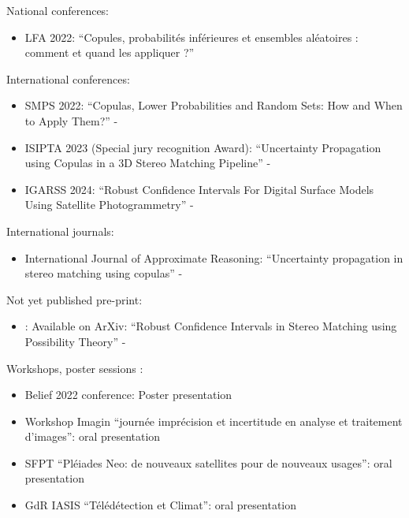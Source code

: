 \noindent National conferences:
\begin{itemize}
    \item LFA 2022: ``Copules, probabilités inférieures et ensembles aléatoires : comment et quand les appliquer ?''  \cite{malinowski_copules_2022}
\end{itemize}
International conferences:
\begin{itemize}
    \item SMPS 2022: ``Copulas, Lower Probabilities and Random Sets: How and When to Apply Them?'' - \cite{malinowski_copulas_2022}
    \item ISIPTA 2023 (Special jury recognition Award): ``Uncertainty Propagation using Copulas in a 3D Stereo Matching Pipeline'' -  \cite{malinowski_uncertainty_2023}
    \item IGARSS 2024: ``Robust Confidence Intervals For Digital Surface Models Using Satellite Photogrammetry'' -  \cite{malinowski_robust_2024}
\end{itemize}
International journals:
\begin{itemize}
    \item International Journal of Approximate Reasoning: ``Uncertainty propagation in stereo matching using copulas'' -  \cite{malinowski_uncertainty_2024}
\end{itemize}
Not yet published pre-print:
\begin{itemize}
    \item : Available on ArXiv: ``Robust Confidence Intervals in Stereo Matching using Possibility Theory'' - \cite{malinowski_robust_2024-1}
\end{itemize}
Workshops, poster sessions \etc:
\begin{itemize}
    \item Belief 2022 conference: Poster presentation
    \item Workshop Imagin ``journée imprécision et incertitude en analyse et traitement d'images'': oral presentation
    \item SFPT ``Pléiades Neo: de nouveaux satellites pour de nouveaux usages'': oral presentation
    \item GdR IASIS ``Télédétection et Climat'': oral presentation
\end{itemize}

\pagebreak